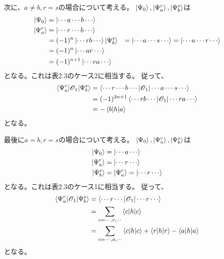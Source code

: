 次に、$a\neq b, r=s$の場合について考える。
$\ket{\Psi_0},\ket{\Psi_{a}^{r}},\ket{\Psi_{b}^{s}}$は
\begin{align}
	\ket{\Psi_0}
&=
	\ket{\cdots a\cdots b\cdots} \\
%
%
	\ket{\Psi_{a}^{r}}
&=
	\ket{\cdots r\cdots b\cdots} \\
%
&=
	(-1)^n \ket{\cdots rb\cdots}
%
%
	\ket{\Psi_{b}^{s}}
&=
	\ket{\cdots a\cdots s\cdots}
=
	\ket{\cdots a\cdots r\cdots} \\
%
&=
	(-1)^n \ket{\cdots ar\cdots} \\
%
&=
	(-1)^{n+1} \ket{\cdots ra\cdots}
\end{align}
となる。これは表2.3のケース2に相当する。
従って、
\begin{align}
	\braket{\Psi_{a}^{r}|\mathscr{O}_1|\Psi_{b}^{s}}
&=
	\braket{\cdots r\cdots b\cdots|\mathscr{O}_1|\cdots a\cdots s\cdots} \\
%
%
&=
	(-1)^{2n+1}
	\braket{\cdots rb\cdots|\mathscr{O}_1|\cdots ra\cdots} \\
%
%
&=
	-\braket{b|h|a}
\end{align}
となる。

最後に$a=b, r=s$の場合について考える。
$\ket{\Psi_0},\ket{\Psi_{a}^{r}},\ket{\Psi_{b}^{s}}$は
\begin{align}
	\ket{\Psi_0}
&=
	\ket{\cdots a\cdots} \\
%
%
	\ket{\Psi_{a}^{r}}
&=
	\ket{\cdots r\cdots} \\
%
%
	\ket{\Psi_{b}^{s}}
&=
	\ket{\Psi_{a}^{r}}
=
	\ket{\cdots r\cdots}
\end{align}
となる。これは表2.3のケース1に相当する。
従って、
\begin{align}
	\braket{\Psi_{a}^{r}|\mathscr{O}_1|\Psi_{b}^{s}}
&=
	\braket{\cdots r\cdots|\mathscr{O}_1|\cdots r\cdots} \\
%
%
&=
	\sum_{c=\cdots,r,\cdots}
		\braket{c|h|c} \\
%
%
&=
	\sum_{c=\cdots,a,\cdots}
		\braket{c|h|c}
	+
	\braket{r|h|r}
	-
	\braket{a|h|a}
\end{align}
となる。

